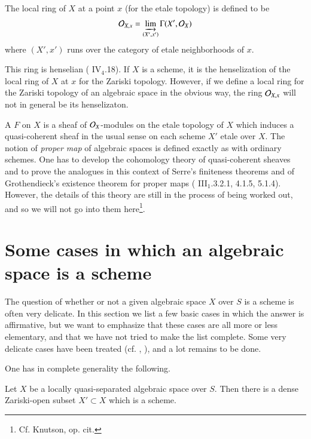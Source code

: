 \begin{definition}\label{art02-defi2.5}
The local ring of $X$ at a point $x$ (for the etale topology) is defined to be
$$
\mathcal{O}_{X,x}=\varinjlim\limits_{(X',x')}\Gamma (X',\mathcal{O}_{X})
$$
where $(X',x')$ runs over the category of etale neighborhoods of $x$.
\end{definition}

This ring is henselian (\cite{art02-key8} IV$_{4}$.18). If $X$ is a scheme, it is the henseli\-zation of the local ring of $X$ at $x$ for the Zariski topology. However, if we define a local ring for the Zariski topology of an algebraic space in the obvious way, the ring $\mathcal{O}_{X,x}$ will not in general be its henselizaton.

A $F$ on $X$ is a sheaf of $\mathcal{O}_{X}$-modules on the etale topology of $X$ which induces a quasi-coherent sheaf in the usual sense on each scheme $X'$ etale over $X$. The notion of {\em proper map} of algebraic spaces is defined exactly as with ordinary schemes. One has to develop the cohomology theory of quasi-coherent sheaves and to prove the analogues in this context of Serre's finiteness theorems and of Grothendieck's existence theorem for proper maps (\cite{art02-key8} III$_{1}$.3.2.1, 4.1.5, 5.1.4). However, the details of this theory are still in the process of being worked out, and so we will not go into them here\footnote{Cf. Knutson, op. cit.}.

\section{Some cases in which an algebraic space is a scheme}\label{art02-sec3}

The question of whether or not a given algebraic space $X$ over $S$ is a scheme is often very delicate. In this section we list a few basic cases in which the answer is affirmative, but we want to emphasize that these cases are all more or less elementary, and that we have not tried to make the list complete. Some very delicate cases have been treated (cf. \cite{art02-key25}, \cite{art02-key30}), and a lot remains to be done.

One has in complete generality the following.

\begin{theorem}\label{art02-thm3.1}
Let $X$ be a locally quasi-separated algebraic space over $S$. Then there is a dense Zariski-open subset $X'\subset X$ which is a scheme.
\end{theorem}

